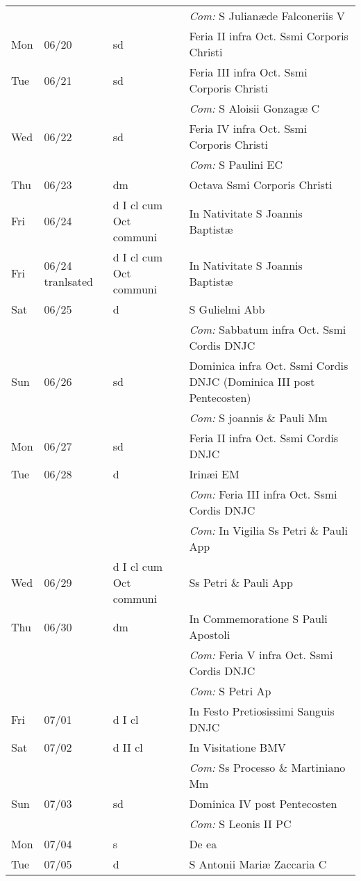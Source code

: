 \documentclass[10pt]{article}
\begin{document}
\begin{longtable}{ l l l l }
 & & & \textit{Com:} S Julianæde Falconeriis V\\
Mon & 06/20 & sd & Feria II infra Oct. Ssmi Corporis Christi\\
Tue & 06/21 & sd & Feria III infra Oct. Ssmi Corporis Christi\\
 & & & \textit{Com:} S Aloisii Gonzagæ C\\
Wed & 06/22 & sd & Feria IV infra Oct. Ssmi Corporis Christi\\
 & & & \textit{Com:} S Paulini EC\\
Thu & 06/23 & dm & Octava Ssmi Corporis Christi\\
Fri & 06/24 & d I cl cum Oct communi & In Nativitate S Joannis Baptistæ\\
Fri & 06/24 tranlsated & d I cl cum Oct communi & In Nativitate S Joannis Baptistæ\\
Sat & 06/25 & d & S Gulielmi Abb\\
 & & & \textit{Com:} Sabbatum infra Oct. Ssmi Cordis DNJC\\
Sun & 06/26 & sd & Dominica infra Oct. Ssmi Cordis DNJC (Dominica III post Pentecosten)\\
 & & & \textit{Com:} S joannis \& Pauli Mm\\
Mon & 06/27 & sd & Feria II infra Oct. Ssmi Cordis DNJC\\
Tue & 06/28 & d & Irinæi EM\\
 & & & \textit{Com:} Feria III infra Oct. Ssmi Cordis DNJC\\
 & & & \textit{Com:} In Vigilia Ss Petri \& Pauli App\\
Wed & 06/29 & d I cl cum Oct communi & Ss Petri \& Pauli App\\
Thu & 06/30 & dm & In Commemoratione S Pauli Apostoli\\
 & & & \textit{Com:} Feria V infra Oct. Ssmi Cordis DNJC\\
 & & & \textit{Com:} S Petri Ap\\
Fri & 07/01 & d I cl & In Festo Pretiosissimi Sanguis DNJC\\
Sat & 07/02 & d II cl & In Visitatione BMV\\
 & & & \textit{Com:} Ss Processo \& Martiniano Mm\\
Sun & 07/03 & sd & Dominica IV post Pentecosten\\
 & & & \textit{Com:} S Leonis II PC\\
Mon & 07/04 & s & De ea\\
Tue & 07/05 & d & S Antonii Mariæ Zaccaria C\\

\end{longtable}
\end{document}
